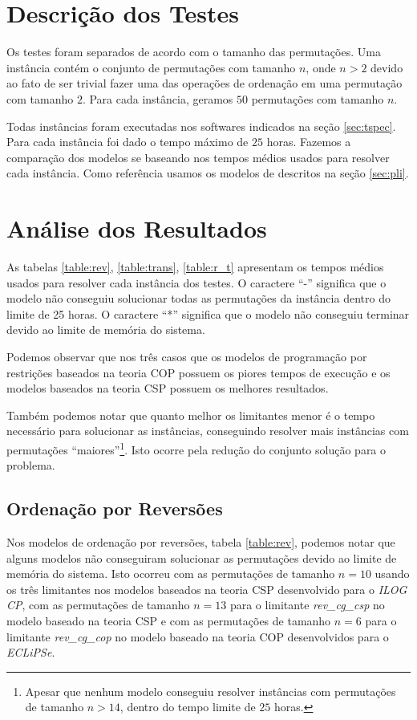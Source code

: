 \section{Descrição dos Testes}
\label{sec:testes}
Os testes foram separados de acordo com o tamanho das
permutações. Uma instância contém o conjunto de permutações com
tamanho $n$, onde $n > 2$ devido ao fato de ser trivial fazer uma das
operações de ordenação em uma permutação com tamanho $2$. Para cada
instância, geramos $50$ permutações com tamanho $n$.

Todas instâncias foram executadas nos softwares indicados na
seção \ref{sec:tspec}. Para cada instância foi dado o tempo máximo de
$25$ horas. Fazemos a comparação dos modelos se baseando nos tempos
médios usados para resolver cada instância. Como referência usamos os
modelos de \pli{} descritos na seção \ref{sec:pli}.

\section{Análise dos Resultados}
\label{sec:analise}
As tabelas \ref{table:rev}, \ref{table:trans}, \ref{table:r_t}
apresentam os tempos médios usados para resolver cada instância dos
testes. O caractere ``-'' significa que o modelo não conseguiu
solucionar todas as permutações da instância dentro do limite de 25
horas. O caractere ``*'' significa que o modelo não conseguiu terminar
devido ao limite de memória do sistema.

Podemos observar que nos três casos que os modelos de programação por
restrições baseados na teoria COP possuem os piores tempos de execução
e os modelos baseados na teoria CSP possuem os melhores
resultados. 

Também podemos notar que quanto melhor os limitantes menor é o tempo
necessário para solucionar as instâncias, conseguindo resolver mais
instâncias com permutações ``maiores''\footnote{Apesar que nenhum
modelo conseguiu resolver instâncias com permutações de tamanho $n >
14$, dentro do tempo limite de $25$ horas.}. Isto ocorre pela redução
do conjunto solução para o problema.

\subsection{Ordenação por Reversões}
\label{subsec:analise_rev}
Nos modelos de ordenação por reversões, tabela \ref{table:rev},
podemos notar que alguns modelos não conseguiram solucionar as
permutações devido ao limite de memória do sistema. Isto ocorreu com
as permutações de tamanho $n = 10$ usando os três limitantes nos
modelos baseados na teoria CSP desenvolvido para o \textit{ILOG CP},
com as permutações de tamanho $n = 13$ para o
limitante \textit{rev\_cg\_csp} no modelo baseado na teoria CSP e com
as permutações de tamanho $n = 6$ para o
limitante \textit{rev\_cg\_cop} no modelo baseado na teoria COP
desenvolvidos para o \textit{ECLiPSe}.

